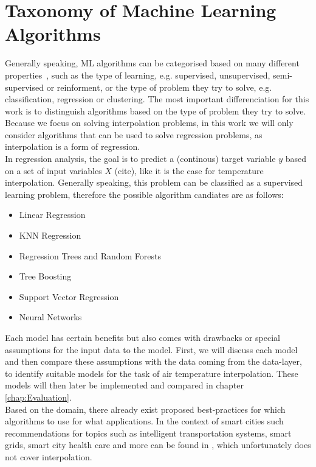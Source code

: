 \section{Taxonomy of Machine Learning Algorithms}


Generally speaking, ML algorithms can be categorised based on many different properties~\cite{sarker2021machine}, such as the type of learning, e.g. supervised, unsupervised, semi-supervised or reinforment, or the type of problem they try to solve, e.g. classification, regression or clustering. The most important differenciation for this work is to distinguish algorithms based on the type of problem they try to solve. Because we focus on solving interpolation problems, in this work we will only consider algorithms that can be used to solve regression problems, as interpolation is a form of regression.\\
In regression analysis, the goal is to predict a (continous) target variable $y$ based on a set of input variables $X$ (cite), like it is the case for temperature interpolation. Generally speaking, this problem can be classified as a supervised learning problem, therefore the possible algorithm candiates are as follows:

\begin{itemize}
    \item Linear Regression
    \item KNN Regression
    \item Regression Trees and Random Forests
    \item Tree Boosting
    \item Support Vector Regression
    \item Neural Networks
\end{itemize}

Each model has certain benefits but also comes with drawbacks or special assumptions for the input data to the model. First, we will discuss each model and then compare these assumptions with the data coming from the data-layer, to identify suitable models for the task of air temperature interpolation. These models will then later be implemented and compared in chapter \ref{chap:Evaluation}.\\
Based on the domain, there already exist proposed best-practices for which algorithms to use for what applications. In the context of smart cities such recommendations for topics such as intelligent transportation systems, smart grids, smart city health care and more can be found in \cite{ullah2020applications}, which unfortunately does not cover interpolation.

